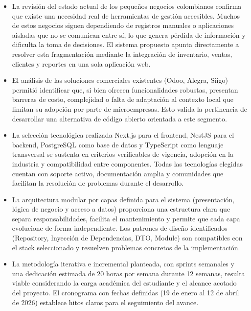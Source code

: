 \documentclass[spanish]{ieee_upb}
\begin{document}
\begin{itemize}
	\item La revisión del estado actual de los pequeños negocios colombianos confirma que existe una necesidad real de herramientas de gestión accesibles. Muchos de estos negocios siguen dependiendo de registros manuales o aplicaciones aisladas que no se comunican entre sí, lo que genera pérdida de información y dificulta la toma de decisiones. El sistema propuesto apunta directamente a resolver esta fragmentación mediante la integración de inventario, ventas, clientes y reportes en una sola aplicación web.

	\item El análisis de las soluciones comerciales existentes (Odoo, Alegra, Siigo) permitió identificar que, si bien ofrecen funcionalidades robustas, presentan barreras de costo, complejidad o falta de adaptación al contexto local que limitan su adopción por parte de microempresas. Esto valida la pertinencia de desarrollar una alternativa de código abierto orientada a este segmento.

	\item La selección tecnológica realizada Next.js para el frontend, NestJS para el backend, PostgreSQL como base de datos y TypeScript como lenguaje transversal se sustenta en criterios verificables de vigencia, adopción en la industria y compatibilidad entre componentes. Todas las tecnologías elegidas cuentan con soporte activo, documentación amplia y comunidades que facilitan la resolución de problemas durante el desarrollo.

	\item La arquitectura modular por capas definida para el sistema (presentación, lógica de negocio y acceso a datos) proporciona una estructura clara que separa responsabilidades, facilita el mantenimiento y permite que cada capa evolucione de forma independiente. Los patrones de diseño identificados (Repository, Inyección de Dependencias, DTO, Module) son compatibles con el stack seleccionado y resuelven problemas concretos de la implementación.

	\item La metodología iterativa e incremental planteada, con sprints semanales y una dedicación estimada de 20 horas por semana durante 12 semanas, resulta viable considerando la carga académica del estudiante y el alcance acotado del proyecto. El cronograma con fechas definidas (19 de enero al 12 de abril de 2026) establece hitos claros para el seguimiento del avance.
\end{itemize}
\end{document}
